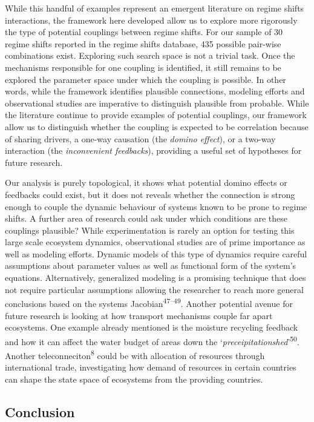 \documentclass[9pt,]{article}
\begin{document}
While this handful of examples represent an emergent literature on
regime shifts interactions, the framework here developed allow us to
explore more rigorously the type of potential couplings between regime
shifts. For our sample of 30 regime shifts reported in the regime shifts
database, 435 possible pair-wise combinations exist. Exploring such
search space is not a trivial task. Once the mechanisms responsible for
one coupling is identified, it still remains to be explored the
parameter space under which the coupling is possible. In other words,
while the framework identifies plausible connections, modeling efforts
and observational studies are imperative to distinguish plausible from
probable. While the literature continue to provide examples of potential
couplings, our framework allow us to distinguish whether the coupling is
expected to be correlation because of sharing drivers, a one-way
causation (the \emph{domino effect}), or a two-way interaction (the
\emph{inconvenient feedbacks}), providing a useful set of hypotheses for
future research.

Our analysis is purely topological, it shows what potential domino
effects or feedbacks could exist, but it does not reveals whether the
connection is strong enough to couple the dynamic behaviour of systems
known to be prone to regime shifts. A further area of research could ask
under which conditions are these couplings plausible? While
experimentation is rarely an option for testing this large scale
ecosystem dynamics, observational studies are of prime importance as
well as modeling efforts. Dynamic models of this type of dynamics
require careful assumptions about parameter values as well as functional
form of the system's equations. Alternatively, generalized modeling is a
promising technique that does not require particular assumptions
allowing the researcher to reach more general conclusions based on the
systems Jacobian\textsuperscript{47--49}. Another potential avenue for
future research is looking at how transport mechanisms couple far apart
ecosystems. One example already mentioned is the moisture recycling
feedback and how it can affect the water budget of areas down the
`\emph{preceipitationshed}'\textsuperscript{50}. Another
teleconneciton\textsuperscript{8} could be with allocation of resources
through international trade, investigating how demand of resources in
certain countries can shape the state space of ecosystems from the
providing countries.

\subsection{Conclusion}\label{conclusion}
\end{document}
